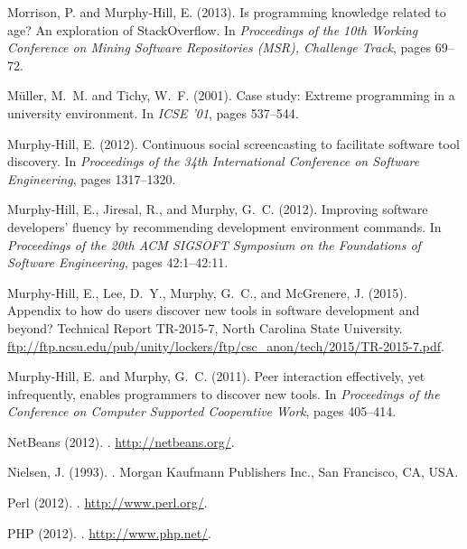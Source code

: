 \documentclass[smallextended]{svjour3}
\begin{document}
\begin{thebibliography}{}
Morrison, P. and Murphy-Hill, E. (2013).
\newblock Is programming knowledge related to age? {An} exploration of
  {StackOverflow}.
\newblock In {\em Proceedings of the 10th Working Conference on Mining Software
  Repositories (MSR), Challenge Track}, pages 69--72.

M\"{u}ller, M.~M. and Tichy, W.~F. (2001).
\newblock Case study: Extreme programming in a university environment.
\newblock In {\em ICSE '01}, pages 537--544.

Murphy-Hill, E. (2012).
\newblock Continuous social screencasting to facilitate software tool
  discovery.
\newblock In {\em Proceedings of the 34th International Conference on Software
  Engineering}, pages 1317--1320.

Murphy-Hill, E., Jiresal, R., and Murphy, G.~C. (2012).
\newblock Improving software developers' fluency by recommending development
  environment commands.
\newblock In {\em Proceedings of the 20th ACM SIGSOFT Symposium on the
  Foundations of Software Engineering}, pages 42:1--42:11.

Murphy-Hill, E., Lee, D.~Y., Murphy, G.~C., and McGrenere, J. (2015).
\newblock Appendix to how do users discover new tools in software development
  and beyond?
\newblock Technical Report TR-2015-7, North Carolina State University.
\newblock
  \url{ftp://ftp.ncsu.edu/pub/unity/lockers/ftp/csc_anon/tech/2015/TR-2015-7.pdf}.

Murphy-Hill, E. and Murphy, G.~C. (2011).
\newblock Peer interaction effectively, yet infrequently, enables programmers
  to discover new tools.
\newblock In {\em Proceedings of the Conference on Computer Supported
  Cooperative Work}, pages 405--414.

{NetBeans} (2012).
.
\newblock \url{http://netbeans.org/}.

Nielsen, J. (1993).
.
\newblock Morgan Kaufmann Publishers Inc., San Francisco, CA, USA.

Perl (2012).
.
\newblock \url{http://www.perl.org/}.

PHP (2012).
.
\newblock \url{http://www.php.net/}.


\end{thebibliography}
\end{document}
